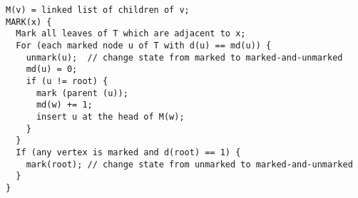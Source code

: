\begin{verbatim}
M(v) = linked list of children of v;
MARK(x) {
  Mark all leaves of T which are adjacent to x;
  For (each marked node u of T with d(u) == md(u)) {
    unmark(u);  // change state from marked to marked-and-unmarked
    md(u) = 0;
    if (u != root) {
      mark (parent (u));
      md(w) += 1;
      insert u at the head of M(w);
    }
  }
  If (any vertex is marked and d(root) == 1) {
    mark(root); // change state from unmarked to marked-and-unmarked
  }
}
\end{verbatim}